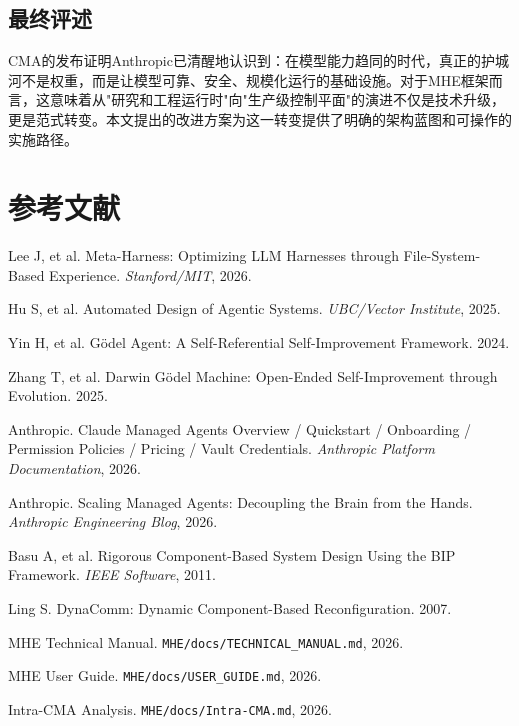 \documentclass[12pt,a4paper]{ctexart}
\begin{document}
\subsection{最终评述}

CMA的发布证明Anthropic已清醒地认识到：在模型能力趋同的时代，真正的护城河不是权重，而是让模型可靠、安全、规模化运行的基础设施。对于MHE框架而言，这意味着从"研究和工程运行时"向"生产级控制平面"的演进不仅是技术升级，更是范式转变。本文提出的改进方案为这一转变提供了明确的架构蓝图和可操作的实施路径。

\newpage
\section*{参考文献}

\begin{enumerate}[label={[\arabic*]}]
    \item Lee J, et al. Meta-Harness: Optimizing LLM Harnesses through File-System-Based Experience. \textit{Stanford/MIT}, 2026.
    \item Hu S, et al. Automated Design of Agentic Systems. \textit{UBC/Vector Institute}, 2025.
    \item Yin H, et al. Gödel Agent: A Self-Referential Self-Improvement Framework. 2024.
    \item Zhang T, et al. Darwin Gödel Machine: Open-Ended Self-Improvement through Evolution. 2025.
    \item Anthropic. Claude Managed Agents Overview / Quickstart / Onboarding / Permission Policies / Pricing / Vault Credentials. \textit{Anthropic Platform Documentation}, 2026.
    \item Anthropic. Scaling Managed Agents: Decoupling the Brain from the Hands. \textit{Anthropic Engineering Blog}, 2026.
    \item Basu A, et al. Rigorous Component-Based System Design Using the BIP Framework. \textit{IEEE Software}, 2011.
    \item Ling S. DynaComm: Dynamic Component-Based Reconfiguration. 2007.
    \item MHE Technical Manual. \texttt{MHE/docs/TECHNICAL\_MANUAL.md}, 2026.
    \item MHE User Guide. \texttt{MHE/docs/USER\_GUIDE.md}, 2026.
    \item Intra-CMA Analysis. \texttt{MHE/docs/Intra-CMA.md}, 2026.
\end{enumerate}
\end{document}
